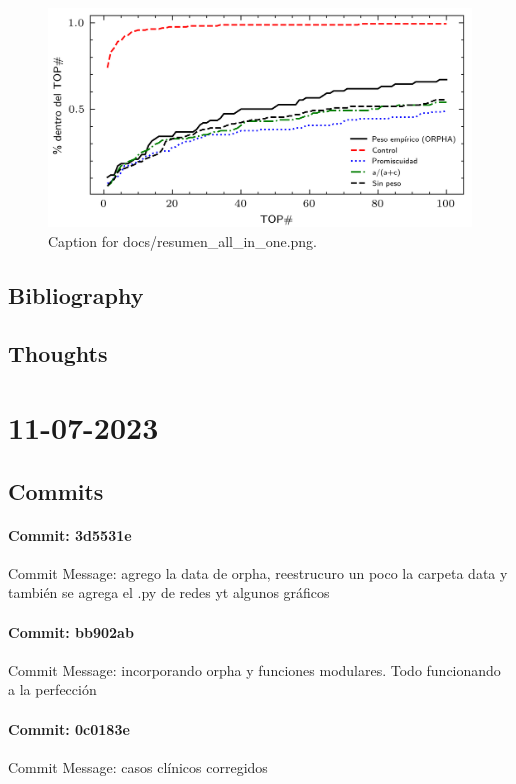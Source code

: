 \documentclass{article}
\begin{document}
\begin{figure}[h] \centering \includegraphics{docs/resumen_all_in_one.png} \caption{Caption for docs/resumen_all_in_one.png.} \end{figure}
\subsection{Bibliography}
\subsection{Thoughts}

\section{11-07-2023}
\subsection{Commits}
\paragraph{Commit: 3d5531e}
Commit Message: agrego la data de orpha, reestrucuro un poco la carpeta data y también se agrega el .py de redes yt algunos gráficos

\paragraph{Commit: bb902ab}
Commit Message: incorporando orpha y funciones modulares. Todo funcionando a la perfección

\paragraph{Commit: 0c0183e}
Commit Message: casos clínicos corregidos
\end{document}
